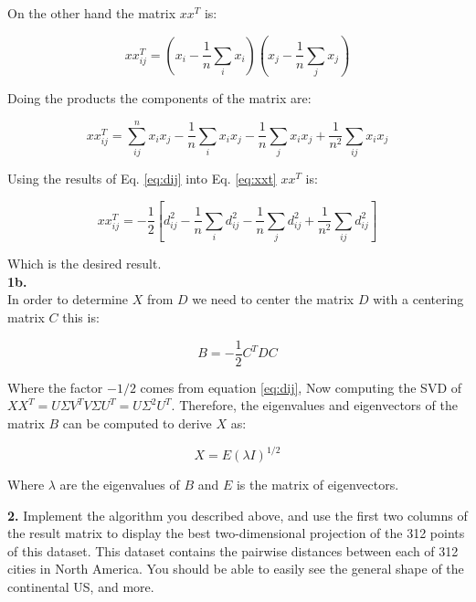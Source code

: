 \documentclass[14pt]{article}
\begin{document}
On the other hand the matrix $xx^T$ is:

\begin{equation}
x x^T_{ij} = (x_i - \dfrac{1}{n}\sum_i x_i )(x_j - \dfrac{1}{n}\sum_j
x_j )
\end{equation}

Doing the products the components of the matrix are:

\begin{equation}\label{eq:xxt}
xx^T_{ij} =  \sum_{ij}^n x_i x_j - \dfrac{1}{n} \sum_i x_i x_j -
\dfrac{1}{n}\sum_j x_i x_j + \dfrac{1}{n^2} \sum_{ij} x_i x_j 
\end{equation}

Using the results of Eq. \ref{eq:dij} into Eq. \ref{eq:xxt} $xx^T$ is:

\begin{equation}
xx^T_{ij} =  -\dfrac{1}{2} \left[  d_{ij}^2 - \dfrac{1}{n}
\sum_i d_{ij}^2 -
\dfrac{1}{n}\sum_j d_{ij}^2 + \dfrac{1}{n^2} \sum_{ij} d_{ij}^2 \right]
\end{equation}

Which is the desired result.\\

\textbf{1b.}\\ 

In order to determine $X$ from $D$ we need to center the matrix $D$
with a centering matrix $C$ this is:

\begin{equation}
B = -\dfrac{1}{2} C^T D C
\end{equation}

Where the factor $-1/2$ comes from equation \ref{eq:dij}, Now
computing the SVD of $XX^T = U\Sigma V^T V \Sigma U^T = U \Sigma^2
U^T$. Therefore, the eigenvalues and eigenvectors of the matrix $B$
can be computed to derive $X$ as:

\begin{equation}
X = E (\lambda I)^{1/2}
\end{equation}

Where $\lambda$ are the eigenvalues of $B$ and $E$ is the matrix of
eigenvectors.

\begin{mdframed}

\textbf{2.} Implement the algorithm you described above, and use the first two
columns of the result matrix to display the best two-dimensional
projection of the 312 points of this dataset. This dataset contains
the pairwise distances between each of 312 cities in North America.
You should be able to easily see the general shape of the continental
US, and more.

\end{mdframed}
\end{document}
